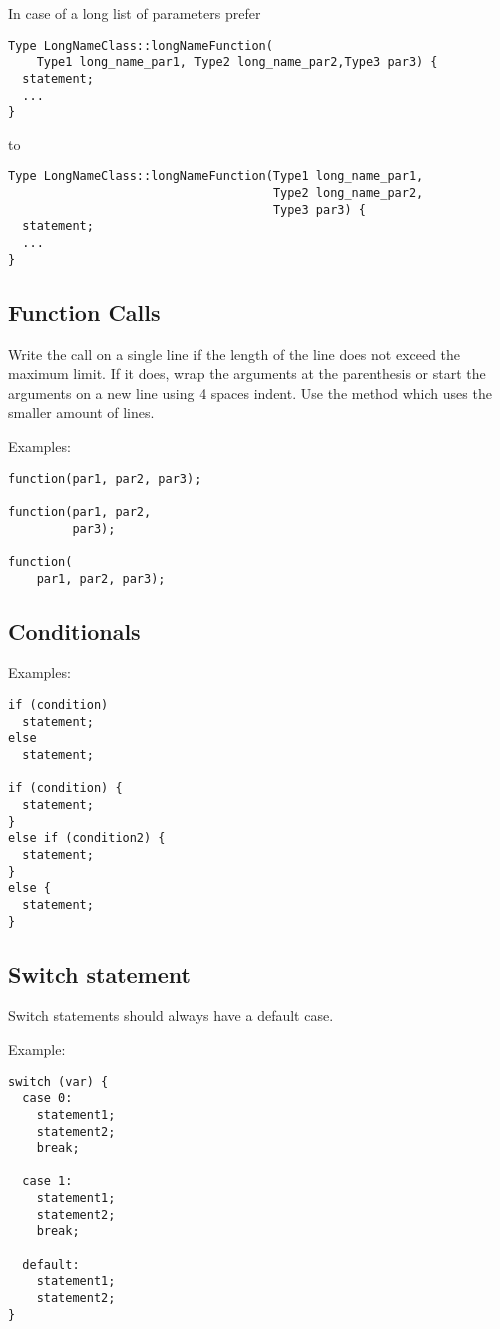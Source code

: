 \documentclass[a4paper]{article}
\begin{document}
\vspace{3em}

In case of a long list of parameters prefer
\begin{lstlisting}
Type LongNameClass::longNameFunction(
    Type1 long_name_par1, Type2 long_name_par2,Type3 par3) {
  statement;
  ...
}
\end{lstlisting}
to
\begin{lstlisting}
Type LongNameClass::longNameFunction(Type1 long_name_par1,
                                     Type2 long_name_par2,
                                     Type3 par3) {
  statement;
  ...
}
\end{lstlisting}

\subsection{Function Calls}

Write the call on a single line if the length of the line does not exceed the maximum limit.
If it does, wrap the arguments at the parenthesis or start the arguments on a new line using 4 spaces indent.
Use the method which uses the smaller amount of lines.

Examples:
\begin{lstlisting}
function(par1, par2, par3);

function(par1, par2,
         par3);

function(
    par1, par2, par3);
\end{lstlisting}

\subsection{Conditionals}

Examples:
\begin{lstlisting}
if (condition)
  statement;
else
  statement;

if (condition) {
  statement;
}
else if (condition2) {
  statement;
}
else {
  statement;
}
\end{lstlisting}

\subsection{Switch statement}

Switch statements should always have a default case.

Example:
\begin{lstlisting}
switch (var) {
  case 0:
    statement1;
    statement2;
    break;

  case 1:
    statement1;
    statement2;
    break;

  default:
    statement1;
    statement2;
}
\end{lstlisting}
\end{document}
